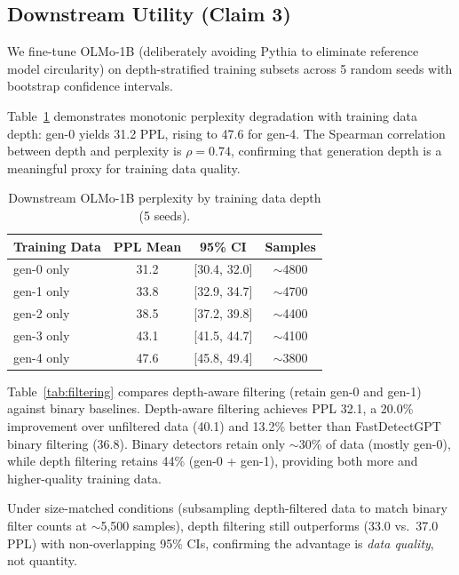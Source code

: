 \documentclass[letterpaper]{article}
\begin{document}
\subsection{Downstream Utility (Claim 3)}
\label{sec:downstream}

We fine-tune OLMo-1B (deliberately avoiding Pythia to eliminate reference model circularity) on depth-stratified training subsets across 5 random seeds with bootstrap confidence intervals.

Table~\ref{tab:depth_ppl} demonstrates monotonic perplexity degradation with training data depth: gen-0 yields 31.2 PPL, rising to 47.6 for gen-4.
The Spearman correlation between depth and perplexity is $\rho = 0.74$, confirming that generation depth is a meaningful proxy for training data quality.

\begin{table}[t]
\centering
\caption{Downstream OLMo-1B perplexity by training data depth (5 seeds).}
\label{tab:depth_ppl}
\begin{tabular}{lccc}
\toprule
Training Data & PPL Mean & 95\% CI & Samples \\
\midrule
gen-0 only & 31.2 & [30.4, 32.0] & ${\sim}$4800 \\
gen-1 only & 33.8 & [32.9, 34.7] & ${\sim}$4700 \\
gen-2 only & 38.5 & [37.2, 39.8] & ${\sim}$4400 \\
gen-3 only & 43.1 & [41.5, 44.7] & ${\sim}$4100 \\
gen-4 only & 47.6 & [45.8, 49.4] & ${\sim}$3800 \\
\bottomrule
\end{tabular}
\end{table}

Table~\ref{tab:filtering} compares depth-aware filtering (retain gen-0 and gen-1) against binary baselines.
Depth-aware filtering achieves PPL 32.1, a 20.0\% improvement over unfiltered data (40.1) and 13.2\% better than FastDetectGPT binary filtering (36.8).
Binary detectors retain only ${\sim}$30\% of data (mostly gen-0), while depth filtering retains 44\% (gen-0 + gen-1), providing both more and higher-quality training data.

Under size-matched conditions (subsampling depth-filtered data to match binary filter counts at ${\sim}$5{,}500 samples), depth filtering still outperforms (33.0 vs.\ 37.0 PPL) with non-overlapping 95\% CIs, confirming the advantage is \emph{data quality}, not quantity.
\end{document}
